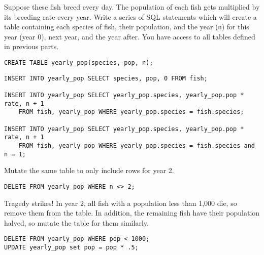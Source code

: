\begin{blocksection}
\question Suppose these fish breed every day. The population of each fish gets multiplied by its breeding rate every year. Write a series of SQL statements which will create a table containing each species of fish, their population, and the year (\texttt{n}) for this year (year 0), next year, and the year after.
You have access to all tables defined in previous parts.

\begin{lstlisting}
CREATE TABLE yearly_pop(species, pop, n);
\end{lstlisting}
\begin{solution}[1.5in]
\begin{lstlisting}
INSERT INTO yearly_pop SELECT species, pop, 0 FROM fish;

INSERT INTO yearly_pop SELECT yearly_pop.species, yearly_pop.pop * rate, n + 1 
    FROM fish, yearly_pop WHERE yearly_pop.species = fish.species;

INSERT INTO yearly_pop SELECT yearly_pop.species, yearly_pop.pop * rate, n + 1 
    FROM fish, yearly_pop WHERE yearly_pop.species = fish.species and n = 1;
\end{lstlisting}
\end{solution}

\question Mutate the same table to only include rows for year 2.
\begin{solution}[1in]
\begin{lstlisting}
DELETE FROM yearly_pop WHERE n <> 2;
\end{lstlisting}
\end{solution}

\question Tragedy strikes! In year 2, all fish with a population less than 1,000 die, so remove them from the table. In addition, the remaining fish have their population halved, so mutate the table for them similarly.
\begin{solution}[1in]
\begin{lstlisting}
DELETE FROM yearly_pop WHERE pop < 1000;
UPDATE yearly_pop set pop = pop * .5;
\end{lstlisting}
\end{solution}
\end{blocksection}